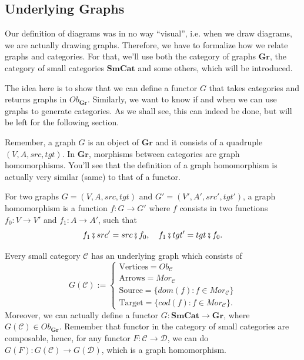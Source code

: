 \subsection{Underlying Graphs}

Our definition of diagrams was in no way ``visual'', i.e. when we draw
diagrams, we are actually drawing graphs. Therefore, we have to formalize how
we relate graphs and categories.
For that, we'll use both the
category of graphs $\mathbf{Gr}$, the category of small categories
$\mathbf{SmCat}$ and some others, which will be introduced.

The idea here is to show that we can define a functor
$G$ that takes categories and returns graphs in $Ob_\mathbf{Gr}$.
Similarly, we want to know if and when we can use graphs to generate categories.
As we shall see, this can indeed be done, but will be left for the following section.

Remember, a graph $G$ is an object of $\mathbf{Gr}$ and it
consists of a quadruple $(V, A, src, tgt)$. In $\mathbf{Gr}$, morphisms
between categories are graph homomorphisms. You'll see that the
definition of a graph homomorphism is actually very similar (same) to that of a functor.

\begin{definition}
  For two graphs $G=(V, A, src, tgt)$ and $G' = (V', A', src', tgt')$,
  a graph homomorphism is a function
  $f:G \to G'$ where $f$ consists in two functions $f_0:V\to V'$ and
  $f_1:A \to A'$, such that
  \begin{displaymath}
    f_1 \fatsemi src' = src \fatsemi f_0, \quad
    f_1 \fatsemi tgt' = tgt \fatsemi f_0.
  \end{displaymath}
\end{definition}

\begin{definition}
  Every small category $\mathcal C$ has an underlying graph which consists of
  \begin{displaymath}
  G(\mathcal C) := \begin{cases}
    \text{Vertices} = Ob_\mathcal C \\
    \text{Arrows} = Mor_\mathcal C \\
    \text{Source} = \{dom(f)  : f \in Mor_\mathcal C\} \\
    \text{Target} = \{cod(f)  : f \in Mor_\mathcal C\}.
    \end{cases}
  \end{displaymath}
  Moreover, we can actually define a functor $G : \mathbf{SmCat} \to \mathbf{Gr}$,
  where $G(\mathcal C) \in Ob_{\mathbf{Gr}}$. Remember that functor in the 
  category of small categories are composable, hence, for any 
  functor $F:\mathcal C \to \mathcal D$, we can do
  $G(F):G(\mathcal C) \to G(\mathcal D)$, which is a graph homomorphism.
\end{definition}

